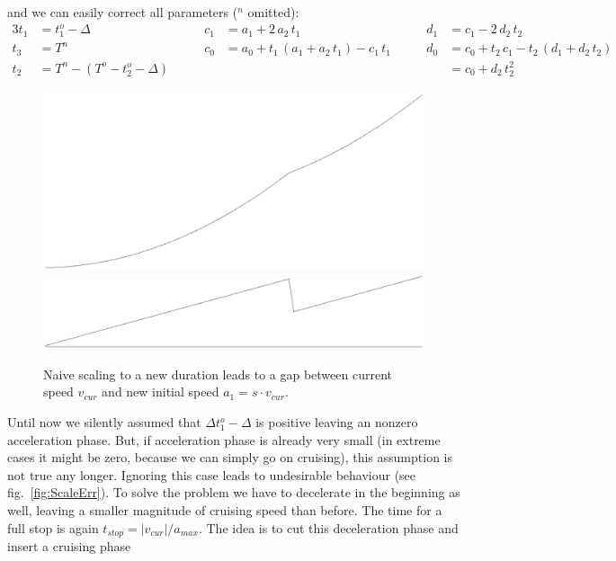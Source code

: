 \documentclass[11pt,english]{article}
\newcommand{\ts}{t_{stop}}
\newcommand{\vc}{v_{cur}}
\newcommand{\am}{a_{max}}
\newcommand{\abs}[1]{|#1|}
\begin{document}
and we can easily correct all parameters ($^n$ omitted):
\begin{alignat*}{3}
  t_1 &= t_1^o - \Delta &\qquad 
  c_1 &= a_1 + 2 \, a_2 \, t_1 &\qquad
  d_1 &= c_1 - 2 \, d_2 \, t_2 \\
%
  t_3 &= T^n &\qquad 
  c_0 &= a_0 + t_1 \, (a_1 + a_2 \, t_1) - c_1 \, t_1 &\qquad
  d_0 &= c_0 + t_2 \, c_1 - t_2 \, (d_1 + d_2 \, t_2) \\
%
  t_2 &= T^n - (T^o - t_2^o - \Delta) &\qquad 
  &&&= c_0 + d_2 \, t_2^2
\end{alignat*}
\begin{figure}
  \centering
  \begin{minipage}[t]{0.45\linewidth}
    \includegraphics[width=\linewidth]{naivescale-x.eps}
    \includegraphics[width=\linewidth]{naivescale-v.eps}
    \caption{Naive scaling to a new duration leads to a gap between current
      speed $\vc$ and new initial speed $a_1 = s \cdot \vc$.}
    \label{fig:NaiveScale}
  \end{minipage}
\end{figure}
Until now we silently assumed that $\Delta t_1^o - \Delta$ is positive leaving
an nonzero acceleration phase. But, if acceleration phase is already very
small (in extreme cases it might be zero, because we can simply go on
cruising), this assumption is not true any longer. Ignoring this case leads to
undesirable behaviour (see fig.~\ref{fig:ScaleErr}). To solve the problem we
have to decelerate in the beginning as well, leaving a smaller magnitude of
cruising speed than before. The time for a full stop is again $\ts = \abs{\vc}
/ \am$. The idea is to cut this deceleration phase and insert a cruising phase
\end{document}
